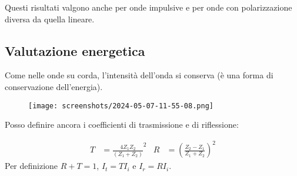 \begin{note}
	Questi risultati valgono anche per onde impulsive e per onde con polarizzazione diversa da quella lineare.
\end{note}

\subsection{Valutazione energetica}
Come nelle onde su corda, l'intensità dell'onda si conserva (è una forma di conservazione dell'energia).
\begin{figure}[H]
	\centering
	\texttt{[image: screenshots/2024-05-07-11-55-08.png]}
\end{figure}
Posso definire ancora i coefficienti di trasmissione e di riflessione:
\begin{definition}
	\begin{align}
		T &= \frac{4 Z_1 Z_2}{(Z_1 + Z_2)}^{2} &
		R &= \left( \frac{Z_2 - Z_1}{Z_1 + Z_2} \right)^{2}  
	\end{align}
	Per definizione \(R + T = 1\), \(I_t = T I_i\) e \(I_r = R I_i\).
\end{definition}